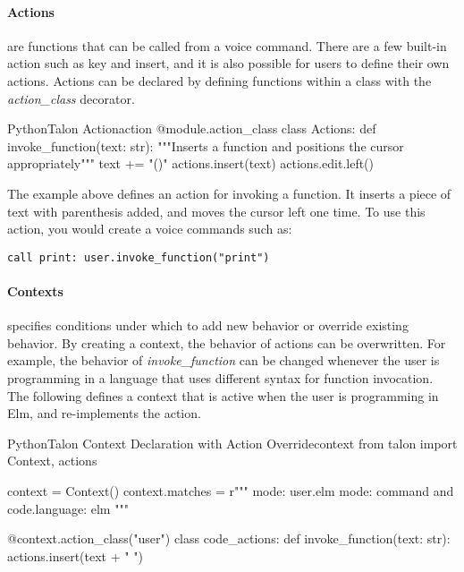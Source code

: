 \documentclass[../thesis.tex]{subfiles}
\begin{document}
\paragraph{Actions}
are functions that can be called from a voice command.
There are a few built-in action such as key and insert, and it is also possible for users to define their own actions.
Actions can be declared by defining functions within a class with the \textit{action\_class} decorator.
\begin{code}{Python}{Talon Action}{action}
@module.action_class
class Actions:
    def invoke_function(text: str):
        """Inserts a function and positions the cursor appropriately"""
        text += "()"
        actions.insert(text)
        actions.edit.left()
\end{code}
The example above defines an action for invoking a function.
It inserts a piece of text with parenthesis added, and moves the cursor left one time.
To use this action, you would create a voice commands such as:
\begin{verbatim}
call print: user.invoke_function("print") 
\end{verbatim}

\paragraph{Contexts}
specifies conditions under which to add new behavior or override existing behavior.
By creating a context, the behavior of actions can be overwritten.
For example, the behavior of \textit{invoke\_function} can be changed
whenever the user is programming in a language that uses different syntax for function invocation.
The following defines a context that is active when the user is programming in Elm,
and re-implements the action.
\begin{code}{Python}{Talon Context Declaration with Action Override}{context}
from talon import Context, actions

context = Context()
context.matches = r"""
mode: user.elm
mode: command
and code.language: elm
"""

@context.action_class("user")
class code_actions:
    def invoke_function(text: str):
        actions.insert(text + " ")
\end{code}
\end{document}
